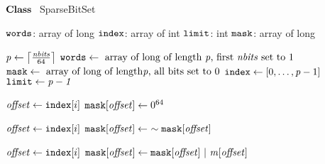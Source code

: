     \STATE $\textbf{Class~}$ SparseBitSet
    \item[]
      \STATE $\texttt{words}$: array of long  \label{line:sbsfield:start}
      \STATE $\texttt{index}$: array of int 
      \STATE $\texttt{limit}$: int 
      \STATE $\texttt{mask}$: array of long  \label{line:sbsfield:end}

    \item[]
     \label{line:initsbs:start}
      \STATE $\mathit{p} \leftarrow \left\lceil\frac{\mathit{nbits}}{64}\right\rceil$
      \STATE $\texttt{words} \leftarrow \text{~array of long of length~} \mathit{p} \text{, first~} 
      \mathit{nbits} \text{~set to 1}$
      \STATE $\texttt{mask} \leftarrow \text{~array of long of length} \mathit{p} \text{, all bits set to~}0$
      \STATE $\texttt{index} \leftarrow [0, \ldots, \mathit{p} - 1]$
      \STATE $\texttt{limit} \leftarrow \mathit{p-1}$ \label{line:initsbs:end}
      \Endfunc

    \item[]
       \label{line:isEmpty:1}
       \label{line:isEmpty:2}
      \Endfunc
    \item[]
       \label{line:clearMask:1}
       \label{line:clearMask:2}
        \STATE $\mathit{offset} \leftarrow \texttt{index}[i]$ \label{line:clearMask:3}
        \STATE $\texttt{mask}[\mathit{offset}] \leftarrow 0^{64}$ \label{line:clearMask:4}
      \ENDFOR
      \Endfunc

    \item[]
       \label{line:reverse:1}
       \label{line:reverse:2}
      \STATE $\mathit{offset} \leftarrow \texttt{index}[i]$ \label{line:reverse:3}
      \STATE $\texttt{mask}[\Offset] \leftarrow \ \sim\texttt{mask}[\Offset]$  \label{line:reverse:4}
      \ENDFOR
      \Endfunc




    \item[]
       \label{line:addToMask:1}
       \label{line:addToMask:2}
      \STATE $\mathit{offset} \leftarrow \texttt{index}[i]$ \label{line:addToMask:3}
      \STATE $\texttt{mask}[\localvar{offset}] \leftarrow \texttt{mask}[\localvar{offset}] \ | \ 
      \localvar{m}[\localvar{offset}]$  \label{line:addToMask:4}
      \ENDFOR
      \Endfunc

